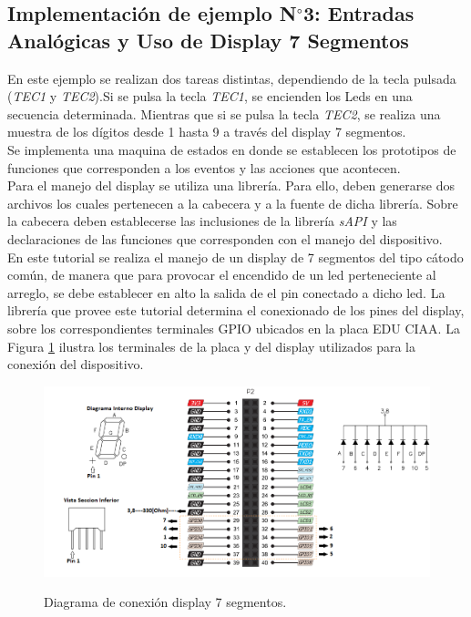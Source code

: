 \documentclass[12pt,letterpaper]{article}
\begin{document}
\subsection{Implementación de ejemplo N$^{\circ}$3: Entradas Analógicas y Uso de Display 7 Segmentos}\label{sec:ej3sapi}
En este ejemplo se realizan dos tareas distintas, dependiendo de la tecla pulsada (\textit{TEC1} y \textit{TEC2}).Si se pulsa la tecla \textit{TEC1}, se encienden los Leds en una secuencia determinada. Mientras que si se pulsa la tecla \textit{TEC2}, se realiza una muestra de los dígitos desde 1 hasta 9 a través del display 7 segmentos. 
 \\
 
Se implementa una maquina de estados en donde se establecen los prototipos de funciones que corresponden a los eventos y las acciones que acontecen. 
 \\
 
Para el manejo del display se utiliza una librería. Para ello, deben generarse dos archivos los cuales pertenecen a la cabecera y a la fuente de dicha librería. Sobre la cabecera deben establecerse las inclusiones de la librería \textit{sAPI} y las declaraciones de las funciones que corresponden con el manejo del dispositivo.
 \\
 
En este tutorial se realiza el manejo de un display de 7 segmentos del tipo cátodo común, de manera que para provocar el encendido de un led perteneciente al arreglo, se debe establecer en alto la salida de el pin conectado a dicho led. La librería que provee este tutorial determina el conexionado de los pines del display, sobre los correspondientes terminales GPIO ubicados en la placa EDU CIAA. La Figura \ref{Fig23} ilustra los terminales de la placa y del display utilizados para la conexión del dispositivo.


\begin{figure}[H]
\centering
\includegraphics[width=10 cm]{figuras/f5.png}\\
\caption{Diagrama de conexión display 7 segmentos.}
\label{Fig23}
\end{figure}
\end{document}
